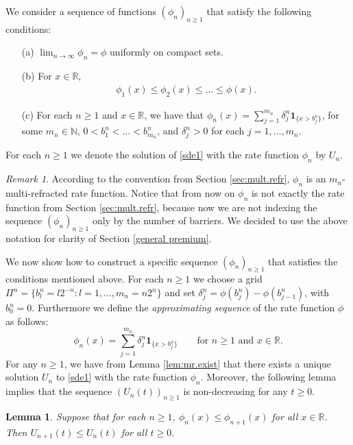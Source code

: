 \documentclass[12pt,reqno]{amsart}
\newcommand{\red}{\textcolor[rgb]{1.00,0.00,0.00}}
\newtheorem{lemma}[theorem]{Lemma}
\theoremstyle{definition}
\theoremstyle{remark}
\newtheorem{remark}[theorem]{Remark}
\newcommand{\ind}{\mathbf{1}}
\begin{document}
We  consider a sequence of functions $(\phi_n)_{n\geq1}$ that satisfy the following conditions:  
  \begin{enumerate}
   \item[(a)] $\lim_{n\to\infty}\phi_n=\phi$ uniformly on compact sets.
   \item[(b)] For $x\in\mathbb{R}$,
     \begin{eqnarray*}
             \phi_1(x)\leq \phi_2(x)\leq \ldots\leq \phi(x).
     \end{eqnarray*}
   \item[(c)] For each $n\geq 1$ and $x\in\mathbb{R}$, we have that $\phi_n(x)=\sum_{j=1}^{m_n}\delta^n_j\ind_{\{x>b_j^n\}}$, for some $m_n \in \mathbb{N}$, 
	$ 0<b_1^n<\ldots<b_{m_n}^n$, and $\delta_j^n>0$ for each $j=1,\dots,m_n$.
     \end{enumerate}
	For each $n\geq1$ we denote the solution of \eqref{sde1} with the rate function $\phi_n$ by $U_n$. 
		\begin{remark}
		According to the convention from Section \ref{sec:mult.refr}, $\phi_n$ is an $m_n$-multi-refracted rate function.
Notice that from now on $\phi_n$ is not exactly the rate function from Section \ref{sec:mult.refr}, because now we are not indexing the sequence $(\phi_n)_{n\geq1}$ only by 
the number of barriers. We decided to use the above notation for clarity of Section \ref{general premium}.
		\end{remark}
		We now show how to construct a specific sequence $(\phi_n)_{n\geq1}$ that satisfies the conditions mentioned above. For each $n\geq 1$ 
		we choose a grid $\Pi^n=\{b^n_l=l2^{-n}:l=1,\dots,m_n=n2^{n}\}$ and set
     $\delta_j^n=\phi(b^n_j)-\phi(b^n_{j-1})$, with $b_0^n=0$. Furthermore we define the {\it approximating sequence} of the rate function $\phi$ as follows:
     \[
     \phi_n(x)=\sum_{j=1}^{m_n}\delta_j^n\ind_{\{x>b_j^n\}}\qquad\text{for $n\geq 1$ and $x\in\mathbb{R}$.}
     \]
     For any $n\geq 1$, we have from Lemma \ref{lem:mr.exist} that there exists 
     a unique solution $U_n$ to \eqref{sde1} with the rate function $\phi_n$.
		Moreover, the following lemma implies that the sequence $(U_n(t))_{n\geq1}$ is non-decreasing for any $t\geq0$.

\begin{lemma}\label{lem:mon}
	Suppose that for each $n\geq 1$, $\phi_n(x)\le \phi_{n+1}(x)$ for all $x\in\mathbb{R}$.
	Then $U_{n+1}(t)\le U_n(t)$ for all $t\ge 0$.
\end{lemma}
\end{document}
